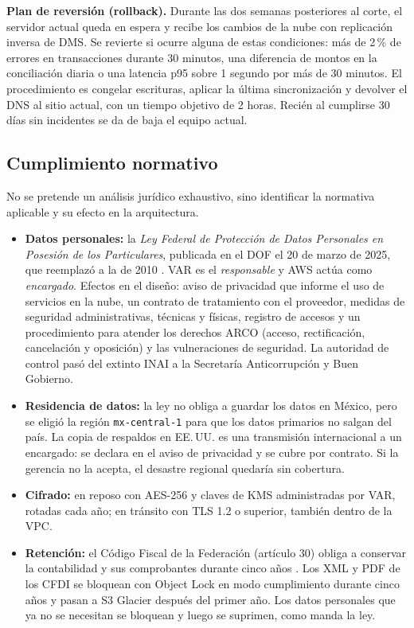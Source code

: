 \documentclass[11pt,letterpaper]{article}
\begin{document}
\textbf{Plan de reversión (rollback).} Durante las dos semanas posteriores al corte, el servidor actual queda en espera y recibe los cambios de la nube con replicación inversa de DMS. Se revierte si ocurre alguna de estas condiciones: más de 2\,\% de errores en transacciones durante 30 minutos, una diferencia de montos en la conciliación diaria o una latencia p95 sobre 1 segundo por más de 30 minutos. El procedimiento es congelar escrituras, aplicar la última sincronización y devolver el DNS al sitio actual, con un tiempo objetivo de 2 horas. Recién al cumplirse 30 días sin incidentes se da de baja el equipo actual.

\subsection{Cumplimiento normativo}\label{sec:cumplimiento}
No se pretende un análisis jurídico exhaustivo, sino identificar la normativa aplicable y su efecto en la arquitectura.
\begin{itemize}
  \item \textbf{Datos personales:} la \emph{Ley Federal de Protección de Datos Personales en Posesión de los Particulares}, publicada en el DOF el 20 de marzo de 2025, que reemplazó a la de 2010 \parencite{lfpdppp}. VAR es el \emph{responsable} y AWS actúa como \emph{encargado}. Efectos en el diseño: aviso de privacidad que informe el uso de servicios en la nube, un contrato de tratamiento con el proveedor, medidas de seguridad administrativas, técnicas y físicas, registro de accesos y un procedimiento para atender los derechos ARCO (acceso, rectificación, cancelación y oposición) y las vulneraciones de seguridad. La autoridad de control pasó del extinto INAI a la Secretaría Anticorrupción y Buen Gobierno.
  \item \textbf{Residencia de datos:} la ley no obliga a guardar los datos en México, pero se eligió la región \texttt{mx-central-1} para que los datos primarios no salgan del país. La copia de respaldos en EE.\,UU. es una transmisión internacional a un encargado: se declara en el aviso de privacidad y se cubre por contrato. Si la gerencia no la acepta, el desastre regional quedaría sin cobertura.
  \item \textbf{Cifrado:} en reposo con AES-256 y claves de KMS administradas por VAR, rotadas cada año; en tránsito con TLS 1.2 o superior, también dentro de la VPC.
  \item \textbf{Retención:} el Código Fiscal de la Federación (artículo 30) obliga a conservar la contabilidad y sus comprobantes durante cinco años \parencite{cff}. Los XML y PDF de los CFDI se bloquean con Object Lock en modo cumplimiento durante cinco años y pasan a S3 Glacier después del primer año. Los datos personales que ya no se necesitan se bloquean y luego se suprimen, como manda la ley.
\end{itemize}
\end{document}
